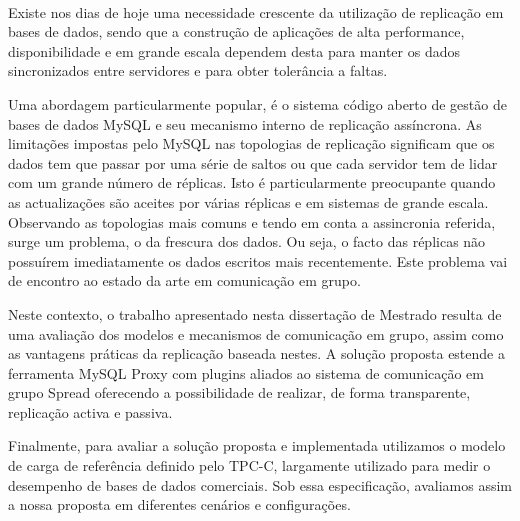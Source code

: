 
\paragraph{}


Existe nos dias de hoje uma necessidade crescente da utilização de replicação em bases de dados, sendo que a construção de aplicações de alta performance, disponibilidade e em grande escala dependem desta para manter os dados sincronizados entre servidores e para obter tolerância a faltas.





Uma abordagem particularmente popular, é o sistema código aberto de gestão de bases de dados MySQL e seu mecanismo interno de replicação assíncrona. As limitações impostas pelo MySQL nas topologias de replicação significam que os dados tem que passar por uma série de saltos ou que cada servidor tem de lidar com um grande número de réplicas. Isto é particularmente preocupante quando as actualizações são aceites por várias réplicas e em sistemas de grande escala. Observando as topologias mais comuns e tendo em conta a assincronia referida, surge um problema, o da frescura dos dados. Ou seja, o facto das réplicas não possuírem imediatamente os dados escritos mais recentemente. Este problema vai de encontro ao estado da arte em comunicação em grupo. %

Neste contexto, o trabalho apresentado nesta dissertação de Mestrado resulta de uma avaliação dos modelos e mecanismos de comunicação em grupo, assim como as vantagens práticas da replicação baseada nestes. A solução proposta estende a ferramenta MySQL Proxy com plugins aliados ao sistema de comunicação em grupo Spread oferecendo a possibilidade de realizar, de forma transparente, replicação activa e passiva.

Finalmente, para avaliar a solução proposta e implementada utilizamos o modelo de carga de referência definido pelo TPC-C, largamente utilizado para medir o desempenho de bases de dados comerciais. Sob essa especificação, avaliamos assim a nossa proposta em diferentes cenários e configurações.  %


